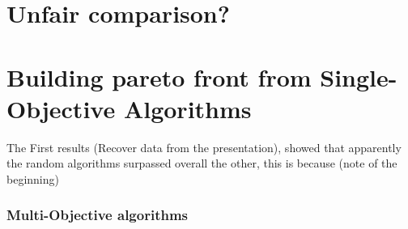 \section{Unfair comparison?}

\section{Building pareto front from Single-Objective Algorithms}


The First results (Recover data from the presentation), showed that apparently the random algorithms surpassed overall the other, this is because (note of the beginning)

\subsubsection{Multi-Objective algorithms}

